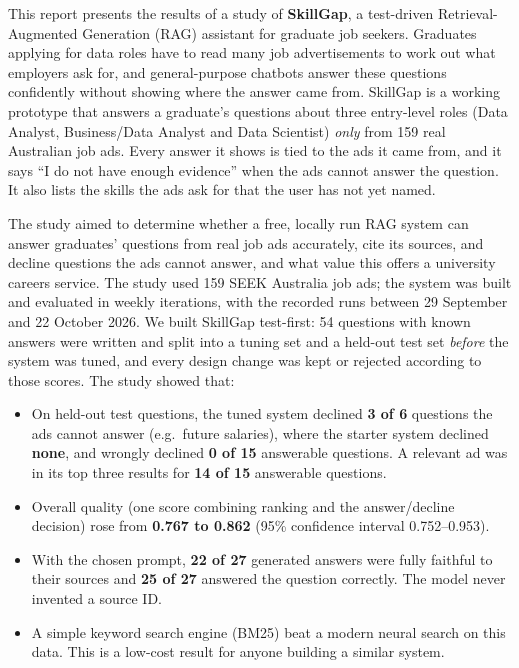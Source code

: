 
This report presents the results of a study of \textbf{SkillGap}, a test-driven Retrieval-Augmented Generation (RAG) assistant for graduate job seekers. Graduates applying for data roles have to read many job advertisements to work out what employers ask for, and general-purpose chatbots answer these questions confidently without showing where the answer came from. SkillGap is a working prototype that answers a graduate's questions about three entry-level roles (Data Analyst, Business/Data Analyst and Data Scientist) \emph{only} from 159 real Australian job ads. Every answer it shows is tied to the ads it came from, and it says ``I do not have enough evidence'' when the ads cannot answer the question. It also lists the skills the ads ask for that the user has not yet named.

The study aimed to determine whether a free, locally run RAG system can answer graduates' questions from real job ads accurately, cite its sources, and decline questions the ads cannot answer, and what value this offers a university careers service. The study used 159 SEEK Australia job ads; the system was built and evaluated in weekly iterations, with the recorded runs between 29 September and 22 October 2026. We built SkillGap test-first: 54 questions with known answers were written and split into a tuning set and a held-out test set \emph{before} the system was tuned, and every design change was kept or rejected according to those scores. The study showed that:

\begin{itemize}
  \item On held-out test questions, the tuned system declined \textbf{3 of 6} questions the ads cannot answer (e.g.\ future salaries), where the starter system declined \textbf{none}, and wrongly declined \textbf{0 of 15} answerable questions. A relevant ad was in its top three results for \textbf{14 of 15} answerable questions.
  \item Overall quality (one score combining ranking and the answer/decline decision) rose from \textbf{0.767 to 0.862} (95\% confidence interval 0.752--0.953).
  \item With the chosen prompt, \textbf{22 of 27} generated answers were fully faithful to their sources and \textbf{25 of 27} answered the question correctly. The model never invented a source ID.
  \item A simple keyword search engine (BM25) beat a modern neural search on this data. This is a low-cost result for anyone building a similar system.
\end{itemize}

